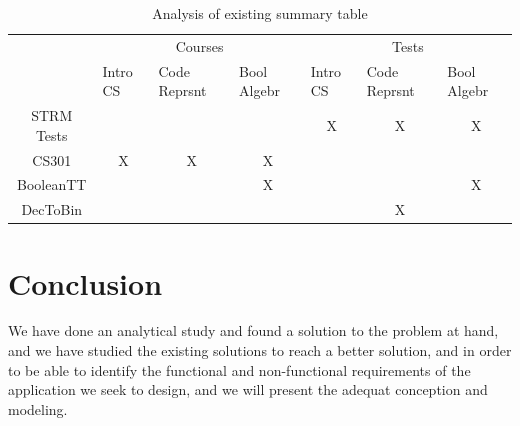 \begin{table}[h!]
\begin{center}
		\begin{tabular}{c|lll|lcl|}
		\cline{2-7}
		\multicolumn{1}{l|}{}                   & \multicolumn{3}{c|}{Courses}                                                                                                                     & \multicolumn{3}{c|}{Tests}                                                                                                                       \\ \cline{2-7} 
		\multicolumn{1}{l|}{\multirow{-2}{*}{}} & \multicolumn{1}{l|}{Intro CS}                  & \multicolumn{1}{l|}{Code Reprsnt}              & Bool Algebr                                    & \multicolumn{1}{l|}{Intro CS}                  & \multicolumn{1}{l|}{Code Reprsnt}              & Bool Algebr                                    \\ \hline
		\multicolumn{1}{|c|}{STRM Tests}        & \multicolumn{1}{l|}{}                          & \multicolumn{1}{l|}{}                          &                                                & \multicolumn{1}{c|}{\cellcolor[HTML]{96FFFB}X} & \multicolumn{1}{c|}{\cellcolor[HTML]{96FFFB}X} & \multicolumn{1}{c|}{\cellcolor[HTML]{96FFFB}X} \\ \hline
		\multicolumn{1}{|c|}{CS301}             & \multicolumn{1}{c|}{\cellcolor[HTML]{96FFFB}X} & \multicolumn{1}{c|}{\cellcolor[HTML]{96FFFB}X} & \multicolumn{1}{c|}{\cellcolor[HTML]{96FFFB}X} & \multicolumn{1}{l|}{}                          & \multicolumn{1}{l|}{}                          &                                                \\ \hline
		\multicolumn{1}{|c|}{BooleanTT}         & \multicolumn{1}{l|}{}                          & \multicolumn{1}{l|}{}                          & \multicolumn{1}{c|}{\cellcolor[HTML]{96FFFB}X} & \multicolumn{1}{l|}{}                          & \multicolumn{1}{c|}{\cellcolor[HTML]{FFFFFF}}  & \multicolumn{1}{c|}{\cellcolor[HTML]{96FFFB}X} \\ \hline
		\multicolumn{1}{|c|}{DecToBin}          & \multicolumn{1}{l|}{}                          & \multicolumn{1}{l|}{}                          &                                                & \multicolumn{1}{l|}{}                          & \multicolumn{1}{c|}{\cellcolor[HTML]{96FFFB}X} &                                                \\ \hline
		\end{tabular}
\end{center}
\caption{Analysis of existing summary table}
\label{tab:AnalysisOfExistingSummaryTable}
\end{table}


\section{Conclusion}
We have done an analytical study and found a solution to the problem at hand, and we have studied the existing solutions to reach a better solution, and in order to be able
to identify the functional and non-functional requirements of the application we seek to
design, and we will present the adequat conception and modeling.
